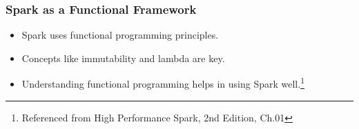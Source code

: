 \begin{frame}
    \frametitle{Spark as a Functional Framework}
    \begin{itemize}
        \item Spark uses functional programming principles.  
        \item Concepts like immutability and lambda are key.  
        \item Understanding functional programming helps in using Spark well.\footnote{Referenced from High Performance Spark, 2nd Edition, Ch.01}  
    \end{itemize}

\end{frame}



